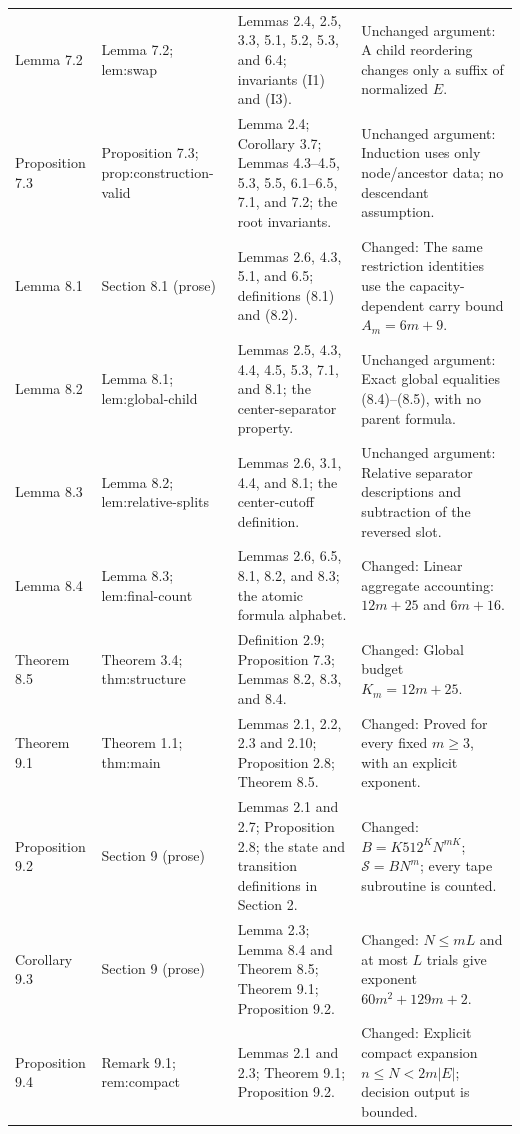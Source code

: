 \documentclass[11pt,a4paper]{article}
\theoremstyle{plain}
\theoremstyle{definition}
\begin{document}
{\begin{longtable}{@{}L{2.6cm}L{3.2cm}L{3.7cm}L{5.1cm}@{}}
Lemma 7.2 & Lemma 7.2; \textsf{lem:\allowbreak swap} & Lemmas 2.4, 2.5, 3.3, 5.1, 5.2, 5.3, and 6.4; invariants (I1) and (I3). & Unchanged argument: A child reordering changes only a suffix of normalized \(E\).\\[3pt]
Proposition 7.3 & Proposition 7.3; \textsf{prop:\allowbreak construction-\allowbreak valid} & Lemma 2.4; Corollary 3.7; Lemmas 4.3--4.5, 5.3, 5.5, 6.1--6.5, 7.1, and 7.2; the root invariants. & Unchanged argument: Induction uses only node/ancestor data; no descendant assumption.\\[3pt]
Lemma 8.1 & Section 8.1 (prose) & Lemmas 2.6, 4.3, 5.1, and 6.5; definitions (8.1) and (8.2). & Changed: The same restriction identities use the capacity-dependent carry bound $A_m=6m+9$.\\[3pt]
Lemma 8.2 & Lemma 8.1; \textsf{lem:\allowbreak global-\allowbreak child} & Lemmas 2.5, 4.3, 4.4, 4.5, 5.3, 7.1, and 8.1; the center-separator property. & Unchanged argument: Exact global equalities (8.4)--(8.5), with no parent formula.\\[3pt]
Lemma 8.3 & Lemma 8.2; \textsf{lem:\allowbreak relative-\allowbreak splits} & Lemmas 2.6, 3.1, 4.4, and 8.1; the center-cutoff definition. & Unchanged argument: Relative separator descriptions and subtraction of the reversed slot.\\[3pt]
Lemma 8.4 & Lemma 8.3; \textsf{lem:\allowbreak final-\allowbreak count} & Lemmas 2.6, 6.5, 8.1, 8.2, and 8.3; the atomic formula alphabet. & Changed: Linear aggregate accounting: \(12m+25\) and \(6m+16\).\\[3pt]
Theorem 8.5 & Theorem 3.4; \textsf{thm:\allowbreak structure} & Definition 2.9; Proposition 7.3; Lemmas 8.2, 8.3, and 8.4. & Changed: Global budget \(K_m=12m+25\).\\[3pt]
Theorem 9.1 & Theorem 1.1; \textsf{thm:\allowbreak main} & Lemmas 2.1, 2.2, 2.3 and 2.10; Proposition 2.8; Theorem 8.5. & Changed: Proved for every fixed \(m\geq3\), with an explicit exponent.\\[3pt]
Proposition 9.2 & Section 9 (prose) & Lemmas 2.1 and 2.7; Proposition 2.8; the state and transition definitions in Section 2. & Changed: $B=K512^KN^{mK}$; $\mathcal{S}=BN^m$; every tape subroutine is counted.\\[3pt]
Corollary 9.3 & Section 9 (prose) & Lemma 2.3; Lemma 8.4 and Theorem 8.5; Theorem 9.1; Proposition 9.2. & Changed: $N\leq mL$ and at most $L$ trials give exponent $60m^2+129m+2$.\\[3pt]
Proposition 9.4 & Remark 9.1; \textsf{rem:\allowbreak compact} & Lemmas 2.1 and 2.3; Theorem 9.1; Proposition 9.2. & Changed: Explicit compact expansion $n\leq N<2m|E|$; decision output is bounded.\\[3pt]
\end{longtable}}
\end{document}
